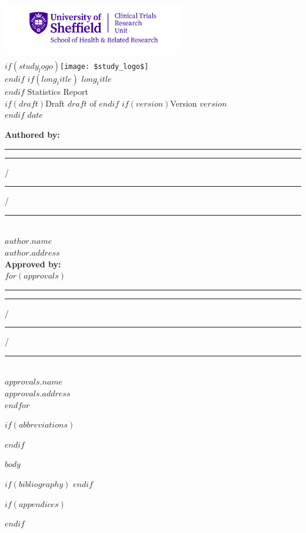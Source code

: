 \documentclass[11pt,a4paper,british]{article}
\begin{document}
\thispagestyle{empty}

\includegraphics[height=2cm]{Images/CTRULogo}
\begin{center}
$if(study_logo) $\texttt{[image: \$study\_logo\$]}\\ $endif$
$if(long_title)$ $long_title$\\[5mm] $endif$
{\Huge Statistics Report}\\
$if(draft)${\Large Draft $draft$ of }$endif$ $if(version)${\Large Version $version$}\\$endif$
{\Large $date$}
\end{center}

\begin{singlespace}
\textbf{Authored by:}\\[1cm]
\rule{5cm}{1pt}\hspace{5cm}\rule{1cm}{1pt} /\rule{1cm}{1pt} /\rule{2cm}{1pt}\\
\textit{$author.name$\\
$author.address$}\\[3mm]
\textbf{Approved by:}\\[1cm]
$for(approvals)$
\rule{5cm}{1pt}\hspace{5cm}\rule{1cm}{1pt} /\rule{1cm}{1pt} /\rule{2cm}{1pt}\\
\textit{$approvals.name$\\
$approvals.address$}\\[1cm]
$endfor$
\end{singlespace}

\clearpage
{}
\tableofcontents
\listoftables
\listoffigures

$if(abbreviations)$

$endif$

\clearpage
{}

$body$

$if(bibliography)$
\printbibliography[heading=bibintoc]
$endif$

$if(appendices)$
\begin{appendices}



\end{appendices}
$endif$
\end{document}
